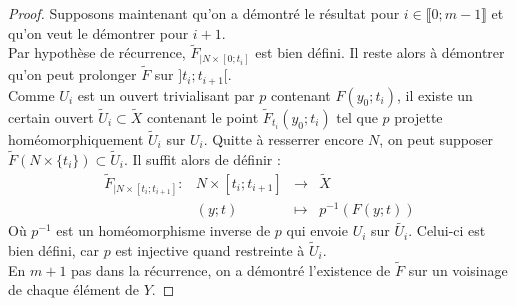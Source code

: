 \begin{proof}
				Supposons maintenant qu'on a démontré le résultat pour $i\in\llbracket0;m-1\rrbracket$ 
				et qu'on veut le démontrer pour $i+1$.\\
				Par hypothèse de récurrence, $\tilde{F}_{|N\times [0;t_{i}]}$ est bien défini. 
				Il reste alors à démontrer qu'on peut prolonger $\tilde{F}$ sur $]t_{i};t_{i+1}[$.\\
				Comme $U_{i}$ est un ouvert trivialisant par $p$ contenant $F(y_{0};t_{i})$, il existe un certain ouvert 
				$\tilde{U}_{i}\subset \tilde{X}$ contenant le point $\tilde{F}_{t_{i}}(y_{0};t_{i})$ tel que $p$ 
				projette homéomorphiquement $\tilde{U}_{i}$ sur $U_{i}$. Quitte à resserrer encore $N$, on peut supposer 
				$\tilde{F}(N\times \{t_{i}\})\subset\tilde{U}_{i}$. Il suffit alors de définir : 
				\[\begin{array}{lccc}
					\tilde{F}_{|N\times [t_{i};t_{i+1}]} :	&	N\times [t_{i};t_{i+1}]	&	\longrightarrow	&	\tilde{X}	\\
															&	(y;t)					&	\mapsto			&	p^{-1}(F(y;t))
				\end{array}\]
				Où $p^{-1}$ est un homéomorphisme inverse de $p$ qui envoie $U_{i}$ sur $\tilde{U_{i}}$. 
				Celui-ci est bien défini, car $p$ est injective quand restreinte à $\tilde{U}_{i}$.\\
				En $m+1$ pas dans la récurrence, on a démontré l'existence de $\tilde{F}$ sur un voisinage de chaque élément de $Y$.
				

\end{proof}
